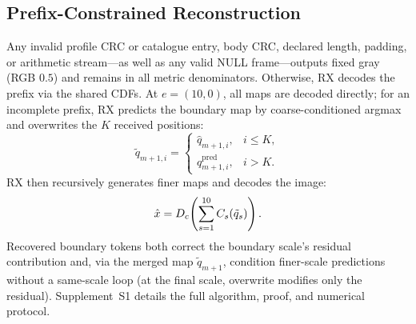 \ifCLASSOPTIONonecolumn\else\fi
\subsection{Prefix-Constrained Reconstruction}
Any invalid profile CRC or catalogue entry, body CRC, declared length, padding, or arithmetic stream---as well as any valid NULL frame---outputs fixed gray (RGB $0.5$) and remains in all metric denominators. Otherwise, RX decodes the prefix via the shared CDFs. At $e=(10,0)$, all maps are decoded directly; for an incomplete prefix, RX predicts the boundary map by coarse-conditioned argmax and overwrites the $K$ received positions:
\begin{equation}
\tilde q_{m+1,i}=\begin{cases}\hat q_{m+1,i},&i\leq K,\\q^{\mathrm{pred}}_{m+1,i},&i>K.\end{cases}
\label{eq:overwrite}
\end{equation}
RX then recursively generates finer maps and decodes the image:
\begin{equation}
\hat x=D_c\!\left(\sum_{s=1}^{10}C_s(\tilde q_s)\right).
\label{eq:reconstruction}
\end{equation}
Recovered boundary tokens both correct the boundary scale's residual contribution and, via the merged map $\tilde q_{m+1}$, condition finer-scale predictions without a same-scale loop (at the final scale, overwrite modifies only the residual). Supplement~S1 details the full algorithm, proof, and numerical protocol.
